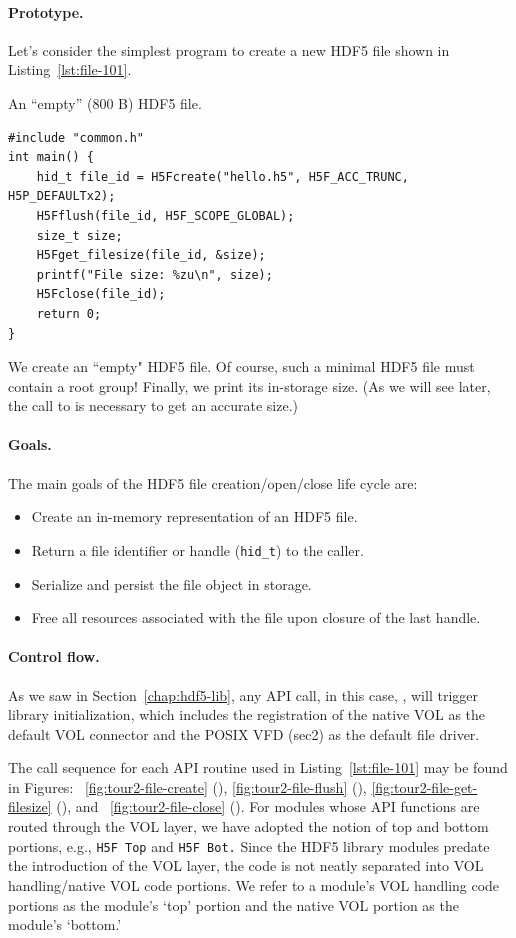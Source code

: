 \paragraph{Prototype.} Let's consider the simplest program to create a new HDF5 file shown in Listing~\ref{lst:file-101}.

\begin{listing}
\centering
\caption{An ``empty'' (800 B) HDF5 file.}
\label{lst:file-101}
\begin{verbatim}
#include "common.h"
int main() {
    hid_t file_id = H5Fcreate("hello.h5", H5F_ACC_TRUNC, H5P_DEFAULTx2);
    H5Fflush(file_id, H5F_SCOPE_GLOBAL);
    size_t size;
    H5Fget_filesize(file_id, &size);
    printf("File size: %zu\n", size);
    H5Fclose(file_id);
    return 0;
}
\end{verbatim}
\end{listing}

We create an ``empty" HDF5 file. Of course, such a minimal HDF5 file must contain a root group! Finally, we print its in-storage size. (As we will see later, the call to  is necessary to get an accurate size.)

\paragraph{Goals.} The main goals of the HDF5 file creation/open/close life cycle are:
\begin{itemize}
    \item Create an in-memory representation of an HDF5 file.
    \item Return a file identifier or handle (\texttt{hid\_t}) to the caller.
    \item Serialize and persist the file object in storage.
    \item Free all resources associated with the file upon closure of the last handle.
\end{itemize}

\paragraph{Control flow.} As we saw in Section~\ref{chap:hdf5-lib}, any API call, in this case, , will trigger library initialization, which includes the registration of the native VOL as the default VOL connector and the POSIX VFD (sec2) as the default file driver.

The call sequence for each API routine used in Listing~\ref{lst:file-101} may be found in Figures: ~\ref{fig:tour2-file-create} (), \ref{fig:tour2-file-flush} (), \ref{fig:tour2-file-get-filesize} (), and ~\ref{fig:tour2-file-close} (). For modules whose API functions are routed through the VOL layer, we have adopted the notion of top and bottom portions, e.g., \texttt{H5F Top} and \texttt{H5F Bot.} Since the HDF5 library modules predate the introduction of the VOL layer, the code is not neatly separated into VOL handling/native VOL code portions. We refer to a module's VOL handling code portions as the module's `top' portion and the native VOL portion as the module's `bottom.'


